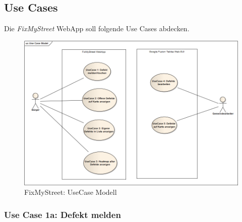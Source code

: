 \begin{figure}[H]
\end{figure}


\subsection{Use Cases}
Die \emph{FixMyStreet} \gls{WebApp} soll folgende Use Cases abdecken.

\begin{figure}[H]
	\centering
	\includegraphics[width=\textwidth]{images/usecase2-fixmystreet/uml/fixmystreet-usecasemodel}
	\caption{FixMyStreet: UseCase Modell}
	\label{fixmystreet-usecasemodel}
\end{figure}

\subsubsection{Use Case 1a: Defekt melden}

